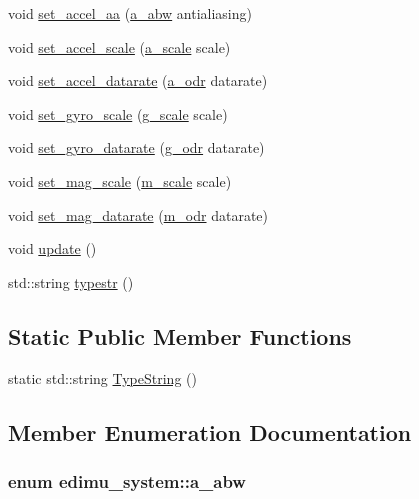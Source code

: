 \begin{DoxyCompactItemize}
void \hyperlink{classedimu__system_ad77a172b80472604b958abe1a7b037a0}{set\-\_\-accel\-\_\-aa} (\hyperlink{classedimu__system_a94b2ea4b980c77a0156baae05fafa278}{a\-\_\-abw} antialiasing)
\item 
void \hyperlink{classedimu__system_a1bed4d35a4ddc0590694a805fffa7c9f}{set\-\_\-accel\-\_\-scale} (\hyperlink{classedimu__system_a61602a34b68df60f8f10c1cd7af37707}{a\-\_\-scale} scale)
\item 
void \hyperlink{classedimu__system_ab813efe0e33b7e6f70af8d6b390a0076}{set\-\_\-accel\-\_\-datarate} (\hyperlink{classedimu__system_a4950d1ca91416ce2221f9f251a4ab409}{a\-\_\-odr} datarate)
\item 
void \hyperlink{classedimu__system_ac765ce7726af6fba582035f5a24ce91e}{set\-\_\-gyro\-\_\-scale} (\hyperlink{classedimu__system_ac676a08f02fdc00d8e8210985f03e692}{g\-\_\-scale} scale)
\item 
void \hyperlink{classedimu__system_a5c188e537c342e56a10d70c8c1a4f9bc}{set\-\_\-gyro\-\_\-datarate} (\hyperlink{classedimu__system_aa3293bf451856110ad0b082b9ec0f857}{g\-\_\-odr} datarate)
\item 
void \hyperlink{classedimu__system_a930fac9420df70417b040d554e29d8db}{set\-\_\-mag\-\_\-scale} (\hyperlink{classedimu__system_ae7dbbcd66d0e16d693ac560884871da3}{m\-\_\-scale} scale)
\item 
void \hyperlink{classedimu__system_aa773e0db8441dc11bbb8399dede49a9c}{set\-\_\-mag\-\_\-datarate} (\hyperlink{classedimu__system_a6912f3ae02645ead8e47b96ebf275b7c}{m\-\_\-odr} datarate)
\item 
void \hyperlink{classedimu__system_a70926a3b36b53f54913fc47ee471fb9b}{update} ()
\item 
std\-::string \hyperlink{classedimu__system_ae3124c577ae10d92f69438f28ce67969}{typestr} ()
\end{DoxyCompactItemize}
\subsection*{Static Public Member Functions}
\begin{DoxyCompactItemize}
\item 
static std\-::string \hyperlink{classedimu__system_a850c2b8420aef618edf9ec36f9436ed4}{Type\-String} ()
\end{DoxyCompactItemize}


\subsection{Member Enumeration Documentation}
\hypertarget{classedimu__system_a94b2ea4b980c77a0156baae05fafa278}{
\subsubsection[{a\-\_\-abw}]{\setlength{\rightskip}{0pt plus 5cm}enum {\bf edimu\-\_\-system\-::a\-\_\-abw}}}\label{classedimu__system_a94b2ea4b980c77a0156baae05fafa278}



